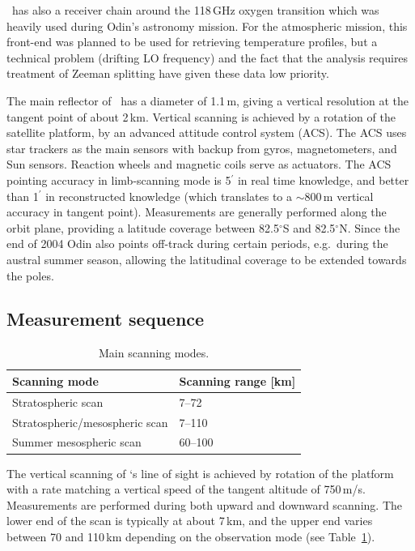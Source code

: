 \smr\ has also a receiver chain around the 118\,GHz oxygen transition which was
heavily used during Odin's astronomy mission. For the atmospheric mission, this
front-end was planned to be used for retrieving temperature profiles, but a
technical problem (drifting LO frequency) and the fact that the analysis
requires treatment of Zeeman splitting have given these data low priority. 

The main reflector of \smr\ has a diameter of 1.1\,m, giving a
vertical resolution at the tangent point of about 2\,km. 
Vertical scanning is achieved by a rotation of the satellite
platform, by an advanced attitude control system (ACS). 
The ACS uses star trackers as the main sensors with backup from gyros, 
magnetometers, and Sun sensors. Reaction wheels and magnetic coils serve as 
actuators. The ACS pointing accuracy in limb-scanning mode is 5\(^{'}\) in
real time knowledge, and better than 1\(^{'}\) in reconstructed knowledge
(which translates to a \(\sim\)800\,m vertical accuracy in tangent point).
Measurements are generally performed along the orbit plane, providing a
latitude coverage between 82.5$^{\circ}$S and 82.5$^{\circ}$N. Since the end of
2004 Odin also points off-track during certain periods, e.g.\ during the
austral summer season, allowing the latitudinal coverage to be extended towards
the poles. 




\subsection{Measurement sequence}

\begin{table}
\caption{Main scanning modes.}
\label{table:scanpattern}
\begin{tabular}{|l|l|}
  \hline
  \textbf{Scanning mode} & \textbf{Scanning range {[}km{]}} \\
  \hline
  Stratospheric scan     &  7--72 \\
 \hline
 Stratospheric/mesospheric scan &  7--110  \\
 \hline
 Summer mesospheric scan & 60--100 \\
 \hline
\end{tabular}
\end{table}


The vertical scanning of \smr`s line of sight is achieved by
rotation of the platform with a rate matching a vertical speed of
the tangent altitude of 750\,m/s. Measurements are performed during
both upward and downward scanning. The lower end of the scan is typically
at about 7\,km, and the upper end varies between 70 and 110\,km depending on
the observation mode (see Table~\ref{table:scanpattern}).

